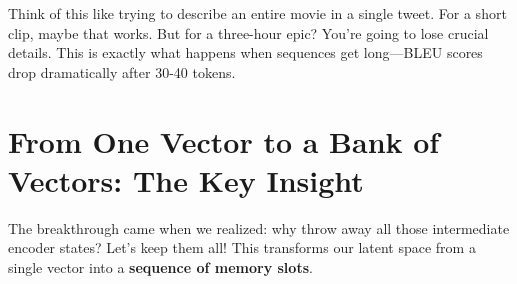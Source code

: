 \documentclass{article}
\begin{document}





\begin{tcolorbox}[colback=yellow!5!white, colframe=orange!50!black, title=The Compression Problem]
Think of this like trying to describe an entire movie in a single tweet. For a short clip, maybe that works. But for a three-hour epic? You're going to lose crucial details. This is exactly what happens when sequences get long—BLEU scores drop dramatically after 30-40 tokens.
\end{tcolorbox}

\section{From One Vector to a Bank of Vectors: The Key Insight}

The breakthrough came when we realized: why throw away all those intermediate encoder states? Let's keep them all! This transforms our latent space from a single vector into a \textbf{sequence of memory slots}.
\end{document}
